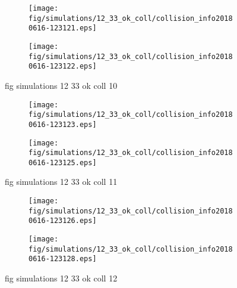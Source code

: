 \begin{figure}[H]
	\centering
	\begin{subfigure}[b]{0.8\textwidth}
		\texttt{[image: fig/simulations/12\_33\_ok\_coll/collision\_info20180616-123121.eps]}
		\caption{}
		\label{fig:simulations:12_33_ok_coll:collision_info20180616-123121}
	\end{subfigure}

	\begin{subfigure}[b]{0.8\textwidth}
		\texttt{[image: fig/simulations/12\_33\_ok\_coll/collision\_info20180616-123122.eps]}
		\caption{}
		\label{fig:simulations:12_33_ok_coll:collision_info20180616-123122}
	\end{subfigure}
	\caption{fig simulations 12 33 ok coll 10}
	\label{fig:simulations:12_33_ok_coll:10}
\end{figure}

\begin{figure}[H]
	\centering
	\begin{subfigure}[b]{0.8\textwidth}
		\texttt{[image: fig/simulations/12\_33\_ok\_coll/collision\_info20180616-123123.eps]}
		\caption{}
		\label{fig:simulations:12_33_ok_coll:collision_info20180616-123123}
	\end{subfigure}

	\begin{subfigure}[b]{0.8\textwidth}
		\texttt{[image: fig/simulations/12\_33\_ok\_coll/collision\_info20180616-123125.eps]}
		\caption{}
		\label{fig:simulations:12_33_ok_coll:collision_info20180616-123125}
	\end{subfigure}
	\caption{fig simulations 12 33 ok coll 11}
	\label{fig:simulations:12_33_ok_coll:11}
\end{figure}

\begin{figure}[H]
	\centering
	\begin{subfigure}[b]{0.8\textwidth}
		\texttt{[image: fig/simulations/12\_33\_ok\_coll/collision\_info20180616-123126.eps]}
		\caption{}
		\label{fig:simulations:12_33_ok_coll:collision_info20180616-123126}
	\end{subfigure}

	\begin{subfigure}[b]{0.8\textwidth}
		\texttt{[image: fig/simulations/12\_33\_ok\_coll/collision\_info20180616-123128.eps]}
		\caption{}
		\label{fig:simulations:12_33_ok_coll:collision_info20180616-123128}
	\end{subfigure}
	\caption{fig simulations 12 33 ok coll 12}
	\label{fig:simulations:12_33_ok_coll:12}
\end{figure}

